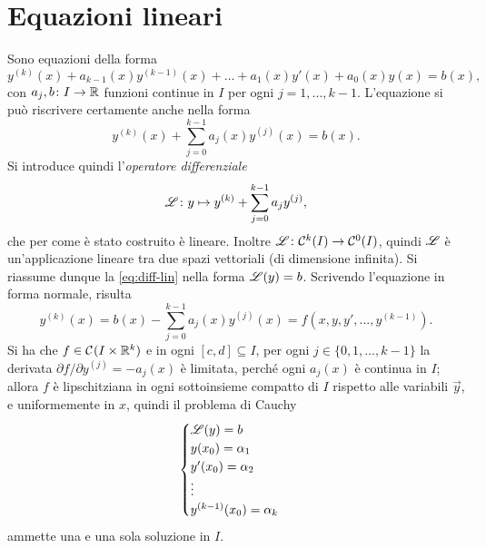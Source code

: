 \section{Equazioni lineari}
Sono equazioni della forma
\begin{equation}
y^{(k)}(x)+a_{k-1}(x)y^{(k-1)}(x)+\dots+a_1(x)y'(x)+a_0(x)y(x)=b(x),
\end{equation}
con $a_j,b\colon I\to\mathbb{R}$ funzioni continue in $I$ per ogni $j=1,\dots,k-1$. L'equazione si può riscrivere certamente anche nella forma
\begin{equation} \label{eq:diff-lin}
y^{(k)}(x)+\sum_{j=0}^{k-1}a_j(x)y^{(j)}(x)=b(x).
\end{equation}
Si introduce quindi l'\emph{operatore differenziale}
\begin{equation} \label{eq:L}
\mathscr L\colon y\mapsto y^{(k)}+\sum_{j=0}^{k-1}a_jy^{(j)},
\end{equation}
che per come è stato costruito è lineare. Inoltre $\mathscr L\colon\mathcal{C}^{{k}}(I)\to\mathcal{C}^{{0}}(I)$, quindi $\mathscr L$ è un'applicazione lineare tra due spazi vettoriali (di dimensione infinita). Si riassume dunque la \eqref{eq:diff-lin} nella forma $\mathscr L(y)=b$.
Scrivendo l'equazione in forma normale, risulta
\[
y^{(k)}(x)=b(x)-\sum_{j=0}^{k-1}a_j(x)y^{(j)}(x)=f(x,y,y',\dots,y^{(k-1)}).
\]
Si ha che $f\in\mathcal{C}^{{}}(I\times\mathbb{R}^k)$ e in ogni $[c,d]\subseteq I$, per ogni $j\in\{0,1,\dots,k-1\}$ la derivata $\partial f/\partial y^{(j)}=-a_j(x)$ è limitata, perché ogni $a_j(x)$ è continua in $I$; allora $f$ è lipschitziana in ogni sottoinsieme compatto di $I$ rispetto alle variabili $\vec y$, e uniformemente in $x$, quindi il problema di Cauchy
\begin{equation} \label{pcL}
\begin{cases}
\mathscr L(y)=b\\
y(x_0)=\alpha_1\\
y'(x_0)=\alpha_2\\
\vdots\\
y^{(k-1)}(x_0)=\alpha_k
\end{cases}
\end{equation}
ammette una e una sola soluzione in $I$.

